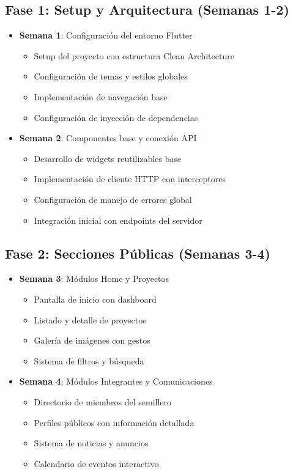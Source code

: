 \documentclass[12pt]{article}
\begin{document}
\subsection{Fase 1: Setup y Arquitectura (Semanas 1-2)}
\begin{itemize}
    \item \textbf{Semana 1}: Configuración del entorno Flutter
    \begin{itemize}
        \item Setup del proyecto con estructura Clean Architecture
        \item Configuración de temas y estilos globales
        \item Implementación de navegación base
        \item Configuración de inyección de dependencias
    \end{itemize}
    
    \item \textbf{Semana 2}: Componentes base y conexión API
    \begin{itemize}
        \item Desarrollo de widgets reutilizables base
        \item Implementación de cliente HTTP con interceptores
        \item Configuración de manejo de errores global
        \item Integración inicial con endpoints del servidor
    \end{itemize}
\end{itemize}

\subsection{Fase 2: Secciones Públicas (Semanas 3-4)}
\begin{itemize}
    \item \textbf{Semana 3}: Módulos Home y Proyectos
    \begin{itemize}
        \item Pantalla de inicio con dashboard
        \item Listado y detalle de proyectos
        \item Galería de imágenes con gestos
        \item Sistema de filtros y búsqueda
    \end{itemize}
    
    \item \textbf{Semana 4}: Módulos Integrantes y Comunicaciones
    \begin{itemize}
        \item Directorio de miembros del semillero
        \item Perfiles públicos con información detallada
        \item Sistema de noticias y anuncios
        \item Calendario de eventos interactivo
    \end{itemize}
\end{itemize}
\end{document}
